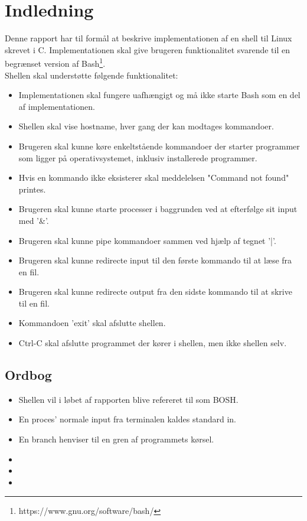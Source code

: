 \section{Indledning}
Denne rapport har til formål at beskrive implementationen af en shell til Linux skrevet i C. Implementationen skal give brugeren funktionalitet svarende til en begrænset version af Bash\footnote{https://www.gnu.org/software/bash/}. \\

Shellen skal understøtte følgende funktionalitet:
\begin{itemize}
	\item Implementationen skal fungere uafhængigt og må ikke starte Bash som en del af implementationen.
	\item Shellen skal vise hostname, hver gang der kan modtages kommandoer.
	\item Brugeren skal kunne køre enkeltstående kommandoer der starter programmer som ligger på operativsystemet, inklusiv installerede programmer.
	\item Hvis en kommando ikke eksisterer skal meddelelsen "Command not found" printes.
	\item Brugeren skal kunne starte processer i baggrunden ved at efterfølge sit input med '\&'.
	\item Brugeren skal kunne pipe kommandoer sammen ved hjælp af tegnet '|'.
	\item Brugeren skal kunne redirecte input til den første kommando til at læse fra en fil.
	\item Brugeren skal kunne redirecte output fra den sidste kommando til at skrive til en fil.
	\item Kommandoen 'exit' skal afslutte shellen.
	\item Ctrl-C skal afslutte programmet der kører i shellen, men ikke shellen selv.
\end{itemize}

\subsection{Ordbog}
\begin{itemize}
	\item Shellen vil i løbet af rapporten blive refereret til som BOSH.
	\item En proces' normale input fra terminalen kaldes standard in.
	\item En branch henviser til en gren af programmets kørsel.
	\item {}
	\item {}
	\item {}
\end{itemize}


